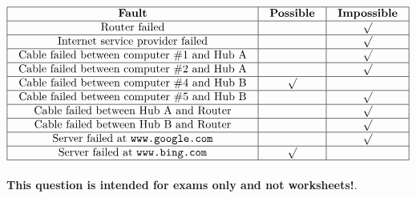 






$$\vbox{\offinterlineskip
\halign{\strut
\vrule \quad\hfil # \ \hfil & 
\vrule \quad\hfil # \ \hfil & 
\vrule \quad\hfil # \ \hfil \vrule \cr
\noalign{\hrule}
%
{\bf Fault} & {\bf Possible} & {\bf Impossible} \cr
%
\noalign{\hrule}
%
Router failed &  & $\surd$ \cr
%
\noalign{\hrule}
%
Internet service provider failed &  & $\surd$ \cr
%
\noalign{\hrule}
%
Cable failed between computer \#1 and Hub A &  & $\surd$ \cr
%
\noalign{\hrule}
%
Cable failed between computer \#2 and Hub A &  & $\surd$ \cr
%
\noalign{\hrule}
%
Cable failed between computer \#4 and Hub B & $\surd$ &  \cr
%
\noalign{\hrule}
%
Cable failed between computer \#5 and Hub B &  & $\surd$ \cr
%
\noalign{\hrule}
%
Cable failed between Hub A and Router &  & $\surd$ \cr
%
\noalign{\hrule}
%
Cable failed between Hub B and Router &  & $\surd$ \cr
%
\noalign{\hrule}
%
Server failed at {\tt www.google.com} &  & $\surd$ \cr
%
\noalign{\hrule}
%
Server failed at {\tt www.bing.com} & $\surd$ &  \cr
%
\noalign{\hrule}
} %
}$$ %







{\bf This question is intended for exams only and not worksheets!}.



